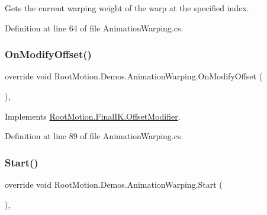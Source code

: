 Gets the current warping weight of the warp at the specified index. 



Definition at line 64 of file Animation\+Warping.\+cs.

\mbox{\label{class_root_motion_1_1_demos_1_1_animation_warping_adae5cbd4af0d90ea0084eb5c0c689dc7}} 
\subsubsection{\texorpdfstring{On\+Modify\+Offset()}{OnModifyOffset()}}
{\footnotesize\ttfamily override void Root\+Motion.\+Demos.\+Animation\+Warping.\+On\+Modify\+Offset (\begin{DoxyParamCaption}{ }\end{DoxyParamCaption})\hspace{0.3cm}{\ttfamily [protected]}, {\ttfamily [virtual]}}



Implements \mbox{\hyperlink{class_root_motion_1_1_final_i_k_1_1_offset_modifier_a777e9ffb4afca3d8647959a79a1120bb}{Root\+Motion.\+Final\+I\+K.\+Offset\+Modifier}}.



Definition at line 89 of file Animation\+Warping.\+cs.

\mbox{\label{class_root_motion_1_1_demos_1_1_animation_warping_a241d2322b0ebf23fac16d77ee0c632ed}} 
\subsubsection{\texorpdfstring{Start()}{Start()}}
{\footnotesize\ttfamily override void Root\+Motion.\+Demos.\+Animation\+Warping.\+Start (\begin{DoxyParamCaption}{ }\end{DoxyParamCaption})\hspace{0.3cm}{\ttfamily [protected]}, {\ttfamily [virtual]}}



